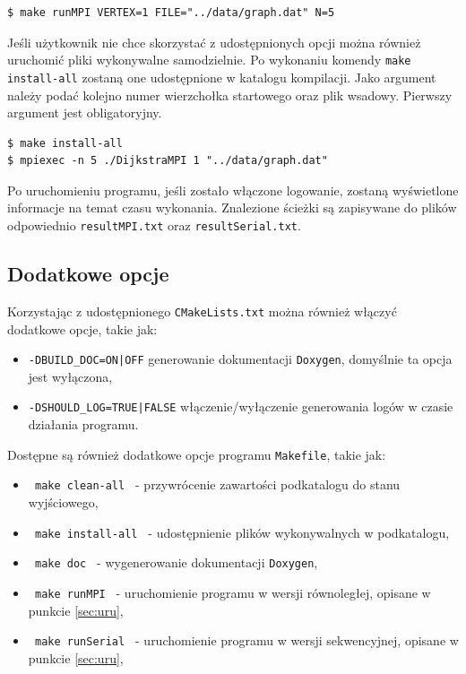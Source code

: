 \documentclass[12pt]{article}
\begin{document}
\begin{lstlisting}[caption={Przykładowe uruchomienie programu.}, captionpos=b ]
$ make runMPI VERTEX=1 FILE="../data/graph.dat" N=5
\end{lstlisting}

Jeśli użytkownik nie chce skorzystać z udostępnionych opcji można również uruchomić pliki wykonywalne samodzielnie. Po wykonaniu komendy \lstinline|make install-all| zostaną one udostępnione w katalogu kompilacji. Jako argument należy podać kolejno numer wierzchołka startowego oraz plik wsadowy. Pierwszy argument jest obligatoryjny.

\begin{lstlisting}[caption={Przykładowe uruchomienie programu z bezpośrednim użyciem plików wykonywalnych.}, captionpos=b ]
$ make install-all
$ mpiexec -n 5 ./DijkstraMPI 1 "../data/graph.dat"
\end{lstlisting}

Po uruchomieniu programu, jeśli zostało włączone logowanie, zostaną wyświetlone informacje na temat czasu wykonania. Znalezione ścieżki są zapisywane do plików odpowiednio \lstinline|resultMPI.txt| oraz \lstinline|resultSerial.txt|.

\subsection{Dodatkowe opcje}
Korzystając z udostępnionego \lstinline|CMakeLists.txt| można również włączyć dodatkowe opcje, takie jak:
\begin{itemize}
\item \lstinline+-DBUILD_DOC=ON|OFF+ generowanie dokumentacji \lstinline|Doxygen|, domyślnie ta opcja jest wyłączona,
\item \lstinline+-DSHOULD_LOG=TRUE|FALSE+ włączenie/wyłączenie generowania logów w czasie działania programu.
\end{itemize}

Dostępne są również dodatkowe opcje programu \lstinline|Makefile|, takie jak:
\begin{itemize}
\item \lstinline| make clean-all | - przywrócenie zawartości podkatalogu do stanu wyjściowego,
\item \lstinline| make install-all | - udostępnienie plików wykonywalnych w podkatalogu,
\item \lstinline| make doc |  - wygenerowanie dokumentacji \lstinline|Doxygen|,
\item \lstinline| make runMPI |  - uruchomienie programu w wersji równoległej, opisane w punkcie \ref{sec:uru},
\item \lstinline| make runSerial |  - uruchomienie programu w wersji sekwencyjnej, opisane w punkcie  \ref{sec:uru},
\end{itemize}
\end{document}
